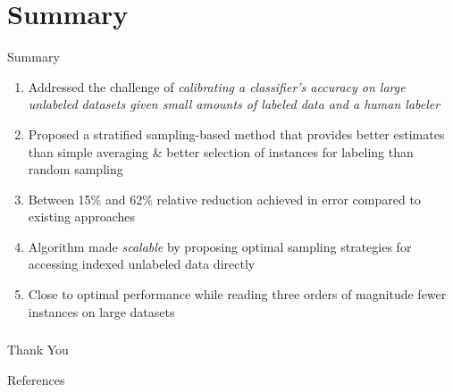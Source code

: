 \documentclass[11pt]{beamer}
\newlength{\wideitemsep}
\let\olditem\item
\renewcommand{\item}{\setlength{\itemsep}{\wideitemsep}\olditem}
\begin{document}

\section{Summary}
\begin{frame}{Summary}
\begin{enumerate}
\item Addressed the challenge of \emph{calibrating a classifier's accuracy on large unlabeled datasets given small amounts of labeled data and a human labeler}
\item Proposed a stratified sampling-based method that provides better estimates than simple averaging \& better selection of instances for labeling than random sampling 
\item Between 15\% and 62\% relative reduction achieved in error compared to existing approaches
\item Algorithm made \emph{scalable} by proposing optimal sampling strategies for accessing indexed unlabeled data directly
\item Close to optimal performance while reading three orders of magnitude fewer instances on large datasets 
\end{enumerate}
\end{frame}

\begin{frame}
\frametitle{}
\begin{center}
\LARGE{Thank You}
\end{center}
\end{frame}


\begin{frame}[allowframebreaks]{References}

\end{frame}
\end{document}
